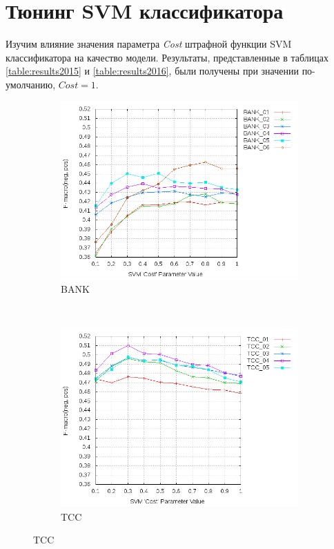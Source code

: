 \section{Тюнинг SVM классификатора}
Изучим влияние значения параметра {\it Cost} штрафной функции SVM классификатора на
качество модели.
Результаты, представленные в таблицах \ref{table:results2015} и \ref{table:results2016},
были получены при значении по-умолчанию, $Cost=1$.

\begin{figure}[!htp] \centering
    \captionsetup[subfigure]{justification=centering}
    \begin{subfigure}[b]{0.45\textwidth}
        \includegraphics[width=\textwidth]{pics/2015_bank_balanced.png}
        \caption{BANK}
        \label{fig:bank_cost_changes_2015}
    \end{subfigure}
    ~
    \begin{subfigure}[b]{0.45\textwidth}
        \includegraphics[width=\textwidth]{pics/2015_ttk_balanced.png}
        \caption{TCC}
        \label{fig:ttk_cost_changes_2015}
    \end{subfigure}


\end{figure}
